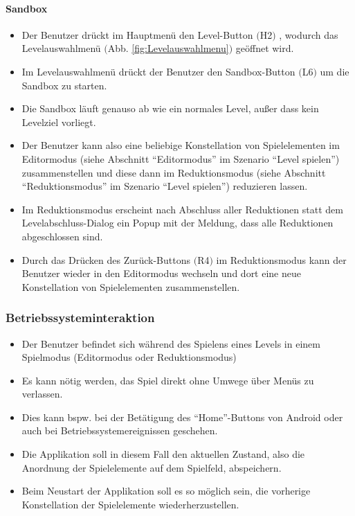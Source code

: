 \paragraph{Sandbox}
\begin{itemize}
	\item Der Benutzer drückt im Hauptmenü den Level-Button $($H2$)$ , wodurch das Levelauswahlmenü $($Abb. \ref{fig:Levelauswahlmenu}$)$ geöffnet wird.
	\item Im Levelauswahlmenü drückt der Benutzer den Sandbox-Button $($L6$)$ um die Sandbox zu starten.
	\item Die Sandbox läuft genauso ab wie ein normales Level, außer dass kein Levelziel vorliegt.
	\item Der Benutzer kann also eine beliebige Konstellation von Spielelementen im Editormodus (siehe Abschnitt "`Editormodus"' im Szenario "`Level spielen"') zusammenstellen und diese dann im Reduktionsmodus (siehe Abschnitt "`Reduktionsmodus"' im Szenario "`Level spielen"') reduzieren lassen.
	\item Im Reduktionsmodus erscheint nach Abschluss aller Reduktionen statt dem Levelabschluss-Dialog ein Popup mit der Meldung, dass alle Reduktionen abgeschlossen sind.
	\item Durch das Drücken des Zurück-Buttons $($R4$)$ im Reduktionsmodus kann der Benutzer wieder in den Editormodus wechseln und dort eine neue Konstellation von Spielelementen zusammenstellen.
\end{itemize}

\subsubsection{Betriebssysteminteraktion}
\begin{itemize}
	\item Der Benutzer befindet sich während des Spielens eines Levels in einem Spielmodus (Editormodus oder Reduktionsmodus) 
	\item Es kann nötig werden, das Spiel direkt ohne Umwege über Menüs zu verlassen.
	\item Dies kann bspw. bei der Betätigung des "`Home"'-Buttons  von Android oder auch bei Betriebssystemereignissen geschehen.
	\item Die Applikation soll in diesem Fall den aktuellen Zustand, also die Anordnung der Spielelemente auf dem Spielfeld, abspeichern.
	\item Beim Neustart der Applikation soll es so möglich sein, die vorherige Konstellation der Spielelemente wiederherzustellen.
\end{itemize}

